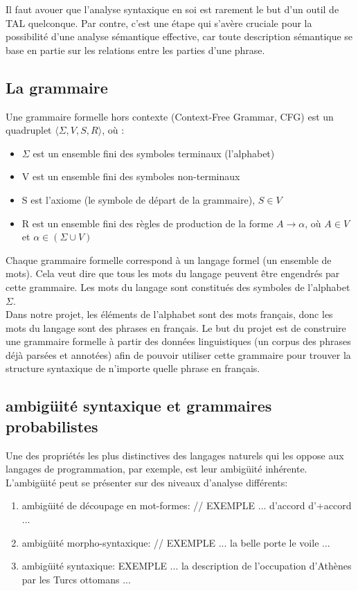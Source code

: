 \documentclass[12pt]{article}
\begin{document}
Il faut avouer que l'analyse syntaxique en soi est rarement le but d'un outil de
TAL quelconque. Par contre, c'est une étape qui s'avère cruciale pour la
possibilité d'une analyse sémantique effective, car toute description
sémantique se base en partie sur les relations entre les parties d'une
phrase.

\subsection{La grammaire}

Une grammaire formelle hors contexte (Context-Free Grammar, CFG) est un
quadruplet $\langle \Sigma, V, S, R \rangle$, où :
\begin{itemize}
\item $\Sigma$ est un ensemble fini des symboles terminaux (l'alphabet)
\item V est un ensemble fini des symboles non-terminaux
\item S est l'axiome (le symbole de départ de la grammaire), $S \in V$
\item R est un ensemble fini des règles de production de la forme $A
\rightarrow \alpha$, où $A \in V$ et $\alpha \in (\Sigma \cup V)$
\end{itemize}

Chaque grammaire formelle correspond à un langage formel (un ensemble de mots).
Cela veut dire que tous les mots du langage peuvent être engendrés par cette
grammaire. Les mots du langage sont constitués des symboles de l'alphabet
$\Sigma$.\\

Dans notre projet, les éléments de l'alphabet sont des mots français, donc les
mots du langage sont des phrases en français. Le but du projet est de construire
une grammaire formelle à partir des données linguistiques (un corpus des phrases
déjà parsées et annotées) afin de pouvoir utiliser cette grammaire pour trouver
la structure syntaxique de n'importe quelle phrase en français.

\subsection{ambig\"uit\'e syntaxique et grammaires probabilistes}

Une des propri\'et\'es les plus distinctives des langages naturels qui les
oppose aux langages de programmation, par exemple, est leur ambig\"uit\'e inh\'erente. L'ambig\"uit\'e peut se pr\'esenter sur des niveaux d'analyse diff\'erents:
\begin{enumerate}
\item ambig\"uit\'e de d\'ecoupage en mot-formes:
//
EXEMPLE ... d'accord d'+accord ...
\item ambig\"uit\'e morpho-syntaxique:
//
EXEMPLE ... la belle porte le voile ...
\item ambig\"uit\'e syntaxique:
EXEMPLE ... la description de l'occupation d'Ath\`enes par les Turcs ottomans ... 
\end{enumerate}
\end{document}
